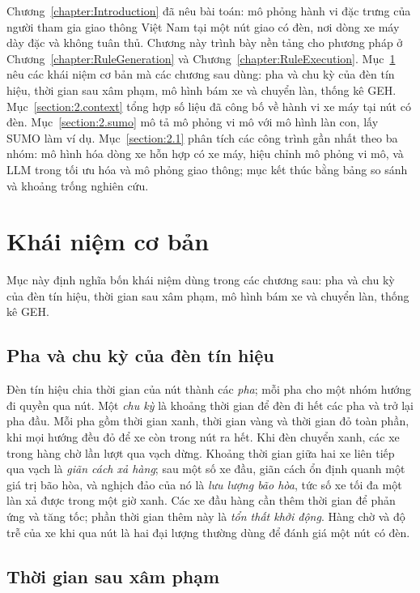 \documentclass[../main.tex]{subfiles}
\begin{document}
Chương~\ref{chapter:Introduction} đã nêu bài toán: mô phỏng hành vi đặc trưng của người tham gia giao thông Việt Nam tại một nút giao có đèn, nơi dòng xe máy dày đặc và không tuân thủ. Chương này trình bày nền tảng cho phương pháp ở Chương~\ref{chapter:RuleGeneration} và Chương~\ref{chapter:RuleExecution}. Mục~\ref{section:2.background} nêu các khái niệm cơ bản mà các chương sau dùng: pha và chu kỳ của đèn tín hiệu, thời gian sau xâm phạm, mô hình bám xe và chuyển làn, thống kê GEH. Mục~\ref{section:2.context} tổng hợp số liệu đã công bố về hành vi xe máy tại nút có đèn. Mục~\ref{section:2.sumo} mô tả mô phỏng vi mô với mô hình làn con, lấy SUMO làm ví dụ. Mục~\ref{section:2.1} phân tích các công trình gần nhất theo ba nhóm: mô hình hóa dòng xe hỗn hợp có xe máy, hiệu chỉnh mô phỏng vi mô, và LLM trong tối ưu hóa và mô phỏng giao thông; mục kết thúc bằng bảng so sánh và khoảng trống nghiên cứu.

\section{Khái niệm cơ bản}
\label{section:2.background}

Mục này định nghĩa bốn khái niệm dùng trong các chương sau: pha và chu kỳ của đèn tín hiệu, thời gian sau xâm phạm, mô hình bám xe và chuyển làn, thống kê GEH.

\subsection{Pha và chu kỳ của đèn tín hiệu}

Đèn tín hiệu chia thời gian của nút thành các \emph{pha}; mỗi pha cho một nhóm hướng đi quyền qua nút. Một \emph{chu kỳ} là khoảng thời gian để đèn đi hết các pha và trở lại pha đầu. Mỗi pha gồm thời gian xanh, thời gian vàng và thời gian đỏ toàn phần, khi mọi hướng đều đỏ để xe còn trong nút ra hết. Khi đèn chuyển xanh, các xe trong hàng chờ lần lượt qua vạch dừng. Khoảng thời gian giữa hai xe liên tiếp qua vạch là \emph{giãn cách xả hàng}; sau một số xe đầu, giãn cách ổn định quanh một giá trị bão hòa, và nghịch đảo của nó là \emph{lưu lượng bão hòa}, tức số xe tối đa một làn xả được trong một giờ xanh. Các xe đầu hàng cần thêm thời gian để phản ứng và tăng tốc; phần thời gian thêm này là \emph{tổn thất khởi động}. Hàng chờ và độ trễ của xe khi qua nút là hai đại lượng thường dùng để đánh giá một nút có đèn.

\subsection{Thời gian sau xâm phạm}
\end{document}
